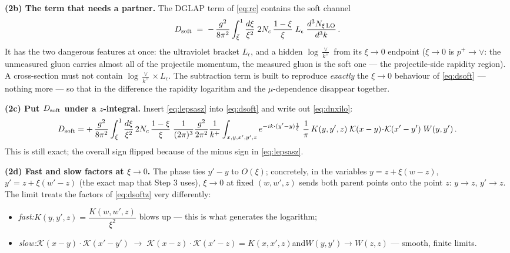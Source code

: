 \documentclass[10pt]{article}
\newcommand{\Leps}{L_{\epsilon}}
\newcommand{\KK}{\mathcal K(x-y)\!\cdot\!\mathcal K(x'-y')}
\begin{document}
\textbf{(2b) The term that needs a partner.} The DGLAP term of \eqref{eq:rc} contains the soft
channel
\begin{align}\label{eq:dsoft}
D_{\rm soft}\;=\;-\,\frac{g^{2}}{8\pi^{2}}\int_{\bar\xi}^{1}\frac{d\xi}{\xi^{2}}\;2N_{c}\,\frac{1-\xi}{\xi}\;\Leps\;\frac{d^{3}N_{\xi\,\rm LO}}{d^{3}k}\,.
\end{align}
It has the two dangerous features at once: the ultraviolet bracket $\Leps$, and a hidden
$\log\frac{\vee}{k^{+}}$ from its $\xi\to0$ endpoint ($\xi\to0$ is $p^{+}\to\vee$: the
unmeasured gluon carries almost all of the projectile momentum, the measured gluon is the soft
one --- the projectile-side rapidity region). A cross-section must not contain
$\log\frac{\vee}{k^{+}}\times\Leps$. The subtraction term is built to reproduce \emph{exactly}
the $\xi\to0$ behaviour of \eqref{eq:dsoft} --- nothing more --- so that in the difference the
rapidity logarithm and the $\mu$-dependence disappear together.

\textbf{(2c) Put $D_{\rm soft}$ under a $z$-integral.} Insert \eqref{eq:lepsasz} into
\eqref{eq:dsoft} and write out \eqref{eq:dnxilo}:
\begin{align}\label{eq:dsoftz}
D_{\rm soft}
=+\,\frac{g^{2}}{8\pi^{2}}\int_{\bar\xi}^{1}\frac{d\xi}{\xi^{2}}\,2N_{c}\,\frac{1-\xi}{\xi}\;
\frac{1}{(2\pi)^{3}}\frac{g^{2}}{2\pi^{2}}\frac{1}{k^{+}}
\int_{x,y,x',y',z} e^{-ik\cdot(y'-y)\frac{1}{\xi}}\;\frac{1}{\pi}\,K(y,y',z)\;\KK\;W(y,y')\,.
\end{align}
This is still exact; the overall sign flipped because of the minus sign in \eqref{eq:lepsasz}.

\textbf{(2d) Fast and slow factors at $\xi\to0$.} The phase ties $y'-y$ to $O(\xi)$; concretely,
in the variables $y=z+\xi(w-z)$, $y'=z+\xi(w'-z)$ (the exact map that Step 3 uses), $\xi\to0$
at fixed $(w,w',z)$ sends both parent points onto the point $z$: $y\to z$, $y'\to z$. The limit
treats the factors of \eqref{eq:dsoftz} very differently:
\begin{itemize}
\item[] \emph{fast:}\quad $K(y,y',z)=\dfrac{K(w,w',z)}{\xi^{2}}$ blows up --- this is what generates the logarithm;
\item[] \emph{slow:}\quad $\KK\;\to\;\mathcal K(x-z)\!\cdot\!\mathcal K(x'-z)=K(x,x',z)$\quad and\quad $W(y,y')\to W(z,z)$ --- smooth, finite limits.
\end{itemize}
\end{document}
